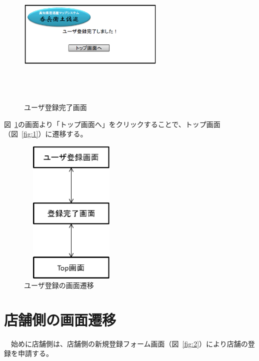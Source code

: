\documentclass[a4j,titlepage]{jarticle}
\begin{document}
\begin {figure}[!htbp]
    \begin{center}
    \includegraphics [height=7cm, width=7cm]{23.eps}
    \caption {ユーザ登録完了画面}
    \label {fig:23}
    \end{center}
\end {figure}



図~\ref{fig:23}の画面より「トップ画面へ」をクリックすることで、トップ画面（図~\ref{fig:1}）に遷移する。



\begin {figure}[!htbp]
    \begin{center}
    \includegraphics [height=7cm, width=5cm]{24.eps}
    \caption {ユーザ登録の画面遷移}
    \label {fig:24}
    \end{center}
\end {figure}
\clearpage
\section{店舗側の画面遷移}


　始めに店舗側は、店舗側の新規登録フォーム画面（図~\ref{fig:2}）により店舗の登録を申請する。
\end{document}
